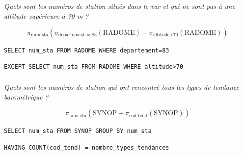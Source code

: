 \documentclass[10pt,fleqn]{article} %
\begin{document}
\else
\fi
\subparagraph{}
\textit{Quels sont les numéros de station situés dans le var et qui ne sont pas à une altitude supérieure à 70 m ?}
\ifprof
\begin{corrige}
$$ \pi_{\text{num\_sta}}\left(\sigma_{\text{departement = 83}} \left(\text{RADOME}\right) - \sigma_{\text{altitude>70}} \left(\text{RADOME}\right) \right) $$

\hspace{1cm} \texttt{SELECT num\_sta FROM RADOME WHERE departement=83}

\hspace{2cm} \texttt{EXCEPT SELECT num\_sta FROM RADOME WHERE altitude>70}
\end{corrige}
\else
\fi

\subparagraph{}
\textit{Quels sont les numéros de station qui ont rencontré tous les types de tendance barométrique ? }
\ifprof
\begin{corrige}
$$ \pi_{\text{num\_sta}}\left(\text{SYNOP} \div \pi_{\text{cod\_tend}}\left(
\text{SYNOP} \right)\right) $$

\hspace{1cm} \texttt{SELECT num\_sta FROM SYNOP GROUP BY num\_sta}

\hspace{2cm} \texttt{HAVING COUNT(cod\_tend) = nombre\_types\_tendances}
\end{corrige}
\else
\fi
\end{document}
